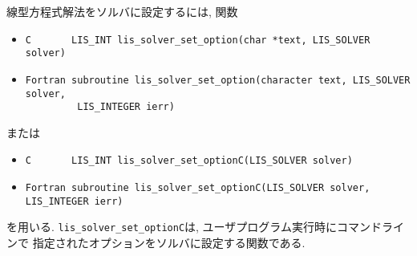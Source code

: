 \documentclass[a4paper]{jarticle}
\begin{document}
{{線型方程式解法をソルバに設定するには, 関数 
\begin{itemize}
\item \verb|C       LIS_INT lis_solver_set_option(char *text, LIS_SOLVER solver)|
\item \verb|Fortran subroutine lis_solver_set_option(character text, LIS_SOLVER solver,|\\
      \verb|         LIS_INTEGER ierr)|
\end{itemize}
または
\begin{itemize}
\item \verb|C       LIS_INT lis_solver_set_optionC(LIS_SOLVER solver)|
\item \verb|Fortran subroutine lis_solver_set_optionC(LIS_SOLVER solver, LIS_INTEGER ierr)|
\end{itemize}
を用いる. 
\verb|lis_solver_set_optionC|は, ユーザプログラム実行時にコマンドラインで
指定されたオプションをソルバに設定する関数である. 

}}
\end{document}
